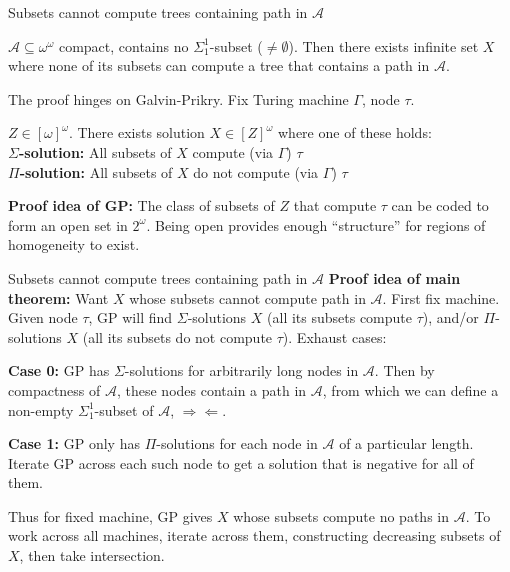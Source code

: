 \begin{frame}{Subsets cannot compute trees containing path in $\mathcal{A}$}
  \begin{main-thm*}
    $\mathcal{A}\subseteq\omega^\omega$ compact, contains no
    $\Sigma_1^1$-subset ($\neq\emptyset$). Then there exists infinite set
    $X$ where none of its subsets can compute a tree that contains a path
    in $\mathcal{A}$.
  \end{main-thm*}

  The proof hinges on Galvin-Prikry. Fix Turing machine $\Gamma$, node
  $\tau$.
  \begin{fact}
    $Z\in[\omega]^\omega$. There exists solution $X\in[Z]^\omega$
    where one of these holds:\\
    \textbf{$\Sigma$-solution:} All subsets of $X$ compute (via $\Gamma$)
    $\tau$ \\
    \textbf{$\Pi$-solution:} All subsets of $X$ do not compute (via
    $\Gamma$) $\tau$
  \end{fact}
  \textbf{Proof idea of GP:} The class of subsets of $Z$ that
  compute $\tau$ can be coded to form an open set in $2^\omega$. Being
  open provides enough ``structure'' for regions of homogeneity to exist.
\end{frame}

\begin{frame}{Subsets cannot compute trees containing path in $\mathcal{A}$}
  \textbf{Proof idea of main theorem:} Want $X$ whose subsets cannot
  compute path in $\mathcal{A}$. First fix machine. Given node
  $\tau$, GP will find $\Sigma$-solutions $X$ (all its subsets compute
  $\tau$), and/or $\Pi$-solutions $X$ (all its subsets do not compute
  $\tau$). Exhaust cases:

  \vspace{1em}
  \textbf{Case 0:} GP has $\Sigma$-solutions for arbitrarily long nodes in
  $\mathcal{A}$. Then by compactness of $\mathcal{A}$, these nodes contain
  a path in $\mathcal{A}$, from which we can define a non-empty
  $\Sigma_1^1$-subset of $\mathcal{A}$, $\Rightarrow\Leftarrow$.

  \vspace{0.5em}
  \textbf{Case 1:} GP only has $\Pi$-solutions for each node in
  $\mathcal{A}$ of a particular length. Iterate GP across each such node to
  get a solution that is negative for all of them.

  \vspace{1em}
  Thus for fixed machine, GP gives $X$ whose subsets compute no paths in
  $\mathcal{A}$. To work across all machines, iterate across them,
  constructing decreasing subsets of $X$, then take intersection.
\end{frame}

